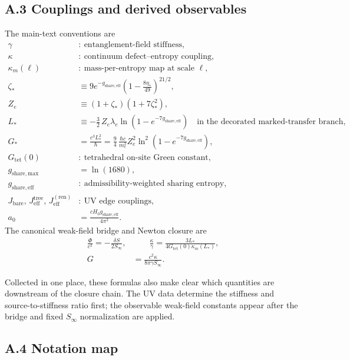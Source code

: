 \documentclass[11pt]{article}
\begin{document}
\subsection*{A.3 Couplings and derived observables}

The main-text conventions are
\begin{align}
\gamma &:\ \text{entanglement-field stiffness},\\
\kappa &:\ \text{continuum defect--entropy coupling},\\
\kappa_m(\ell) &:\ \text{mass-per-entropy map at scale }\ell,\\
\zeta_* &\equiv 9e^{-g_{\mathrm{share,eff}}}
\left(1-\frac{8\eta_*}{49}\right)^{21/2},\\
Z_e &\equiv (1+\zeta_*)(1+7\zeta_*^2),\\
L_* &\equiv -\frac32\,Z_e\lambda_e\ln\!\left(1-e^{-7g_{\mathrm{share,eff}}}\right)
\quad\text{in the decorated marked-transfer branch},\\
G_* &= \frac{c^3L_*^2}{\hbar}
=\frac94\,\frac{\hbar c}{m_e^2}Z_e^2\ln^2\!\left(1-e^{-7g_{\mathrm{share,eff}}}\right),\\
G_{\mathrm{tet}}(0) &:\ \text{tetrahedral on-site Green constant},\\
g_{\mathrm{share,max}} &= \ln(1680),\\
g_{\mathrm{share,eff}} &:\ \text{admissibility-weighted sharing entropy},\\
J_{\mathrm{bare}},\,J_{\mathrm{eff}}^{\mathrm{tree}},\,J_{\mathrm{eff}}^{(\mathrm{ren})} &:\ \text{UV edge couplings},\\
a_0 &= \frac{cH_0 g_{\mathrm{share,eff}}}{4\pi^2}.
\end{align}
The canonical weak-field bridge and Newton closure are
\[
\begin{aligned}
\frac{\Phi}{c^2}=-\frac{\delta S}{2S_\infty},
&\qquad
\frac{\kappa}{\gamma}
=
\frac{3L_*}{4G_{\mathrm{tet}}(0)\kappa_m(L_*)},\\
G&=\frac{c^2\kappa}{8\pi\gamma S_\infty}.
\end{aligned}
\]

Collected in one place, these formulas also make clear which quantities are downstream of the closure chain. The UV data determine the stiffness and source-to-stiffness ratio first; the observable weak-field constants appear after the bridge and fixed $S_\infty$ normalization are applied.

\subsection*{A.4 Notation map}
\end{document}
